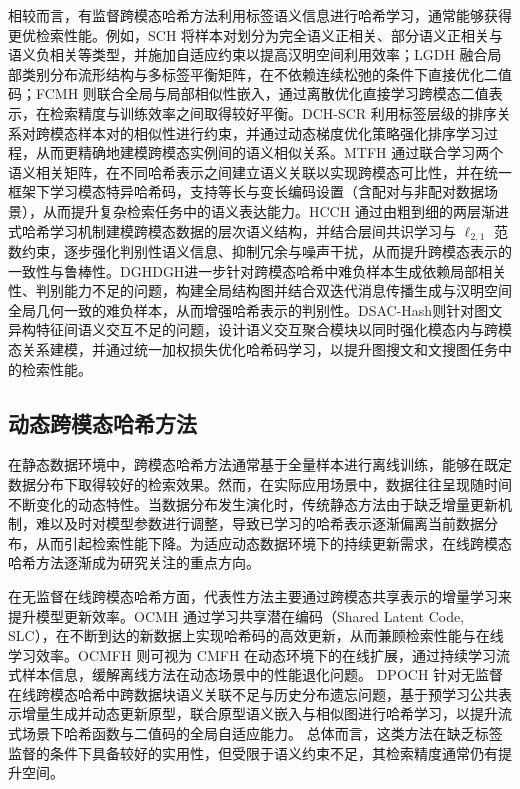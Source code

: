 相较而言，有监督跨模态哈希方法利用标签语义信息进行哈希学习，通常能够获得更优检索性能。例如，SCH 将样本对划分为完全语义正相关、部分语义正相关与语义负相关等类型，并施加自适应约束以提高汉明空间利用效率；LGDH 融合局部类别分布流形结构与多标签平衡矩阵，在不依赖连续松弛的条件下直接优化二值码；FCMH 则联合全局与局部相似性嵌入，通过离散优化直接学习跨模态二值表示，在检索精度与训练效率之间取得较好平衡。DCH-SCR 利用标签层级的排序关系对跨模态样本对的相似性进行约束，并通过动态梯度优化策略强化排序学习过程，从而更精确地建模跨模态实例间的语义相似关系。MTFH 通过联合学习两个语义相关矩阵，在不同哈希表示之间建立语义关联以实现跨模态可比性，并在统一框架下学习模态特异哈希码，支持等长与变长编码设置（含配对与非配对数据场景），从而提升复杂检索任务中的语义表达能力。HCCH 通过由粗到细的两层渐进式哈希学习机制建模跨模态数据的层次语义结构，并结合层间共识学习与 $\ell_{2,1}$ 范数约束，逐步强化判别性语义信息、抑制冗余与噪声干扰，从而提升跨模态表示的一致性与鲁棒性。DGHDGH进一步针对跨模态哈希中难负样本生成依赖局部相关性、判别能力不足的问题，构建全局结构图并结合双迭代消息传播生成与汉明空间全局几何一致的难负样本，从而增强哈希表示的判别性。DSAC-Hash则针对图文异构特征间语义交互不足的问题，设计语义交互聚合模块以同时强化模态内与跨模态关系建模，并通过统一加权损失优化哈希码学习，以提升图搜文和文搜图任务中的检索性能。

\subsection{动态跨模态哈希方法}
在静态数据环境中，跨模态哈希方法通常基于全量样本进行离线训练，能够在既定数据分布下取得较好的检索效果。然而，在实际应用场景中，数据往往呈现随时间不断变化的动态特性。当数据分布发生演化时，传统静态方法由于缺乏增量更新机制，难以及时对模型参数进行调整，导致已学习的哈希表示逐渐偏离当前数据分布，从而引起检索性能下降。为适应动态数据环境下的持续更新需求，在线跨模态哈希方法逐渐成为研究关注的重点方向。

在无监督在线跨模态哈希方面，代表性方法主要通过跨模态共享表示的增量学习来提升模型更新效率。OCMH 通过学习共享潜在编码（Shared Latent Code, SLC），在不断到达的新数据上实现哈希码的高效更新，从而兼顾检索性能与在线学习效率。OCMFH 则可视为 CMFH 在动态环境下的在线扩展，通过持续学习流式样本信息，缓解离线方法在动态场景中的性能退化问题。
DPOCH 针对无监督在线跨模态哈希中跨数据块语义关联不足与历史分布遗忘问题，基于预学习公共表示增量生成并动态更新原型，联合原型语义嵌入与相似图进行哈希学习，以提升流式场景下哈希函数与二值码的全局自适应能力。
总体而言，这类方法在缺乏标签监督的条件下具备较好的实用性，但受限于语义约束不足，其检索精度通常仍有提升空间。

